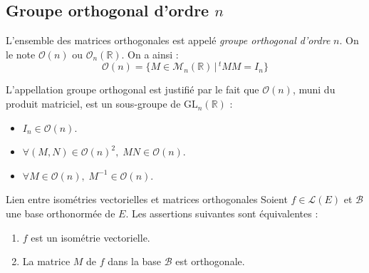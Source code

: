 \documentclass[french,11pt,twoside]{VcCours}
\begin{document}
\subsection{Groupe orthogonal d'ordre \texorpdfstring{$n$}{n}}

\begin{Definition}{} L'ensemble des matrices orthogonales est appelé \emph{groupe orthogonal d'ordre} $n$. On le note $\mathcal{O}(n)$ ou $\mathcal{O}_n(\mathbb{R})$. On a ainsi :
$$ \mathcal{O}(n) = \lbrace M \in \mathcal{M}_n(\mathbb{R}) \, \vert \, ^tM M=I_n \rbrace$$
\end{Definition}

L'appellation groupe orthogonal est justifié par le fait que $\mathcal{O}(n)$, muni du produit matriciel, est un sous-groupe de $\textrm{GL}_n(\mathbb{R})$ :

\begin{Proposition}{} 
\begin{itemize}
\item $I_n \in \mathcal{O}(n)$.
\item $\forall (M,N) \in \mathcal{O}(n)^2, \; MN \in \mathcal{O}(n)$.
\item $\forall M \in \mathcal{O}(n), \; M^{-1} \in \mathcal{O}(n)$.
\end{itemize}
\end{Proposition}

\begin{Demonstration}{}
\vspace{5cm}
\end{Demonstration}

\begin{Proposition}{Lien entre isométries vectorielles et matrices orthogonales}
Soient $f \in \mathcal{L}(E)$ et $\mathcal{B}$ une base orthonormée de $E$.  Les assertions suivantes sont équivalentes :
\begin{enumerate}
\item $f$ est un isométrie vectorielle.
\item La matrice $M$ de $f$ dans la base $\mathcal{B}$ est orthogonale.
\end{enumerate}
\end{Proposition}

\begin{Demonstration}{}
\vspace{5cm}
\end{Demonstration}

\newpage

$\phantom{test}$
\end{document}
